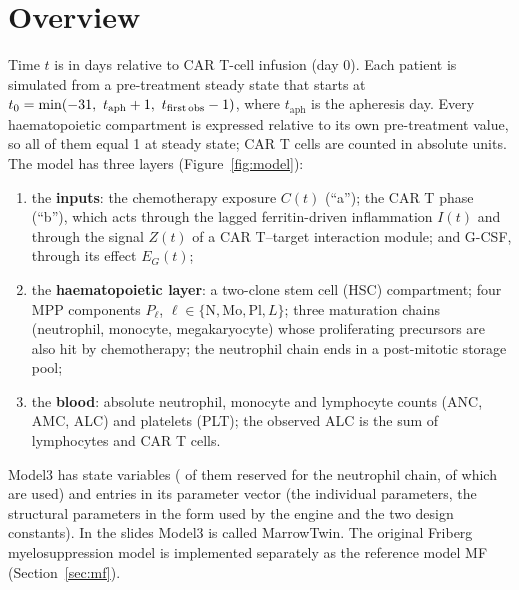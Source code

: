 \documentclass[11pt]{article}
\begin{document}
\tableofcontents
\clearpage

\section{Overview}

Time $t$ is in days relative to CAR T-cell infusion (day 0). Each patient is simulated from a pre-treatment steady state that starts at $t_0=\min(\valTmin,\ t_{\mathrm{aph}}+1,\ t_{\mathrm{first\,obs}}-1)$, where $t_{\mathrm{aph}}$ is the apheresis day. Every haematopoietic compartment is expressed relative to its own pre-treatment value, so all of them equal 1 at steady state; CAR T cells are counted in absolute units. The model has three layers (Figure~\ref{fig:model}):
\begin{enumerate}
\item the \textbf{inputs}: the chemotherapy exposure $C(t)$ (``a''); the CAR T phase (``b''), which acts through the lagged ferritin-driven inflammation $I(t)$ and through the signal $Z(t)$ of a CAR T--target interaction module; and G-CSF, through its effect $E_G(t)$;
\item the \textbf{haematopoietic layer}: a two-clone stem cell (HSC) compartment; four MPP components $P_\ell$, $\ell\in\{\mathrm{N},\mathrm{Mo},\mathrm{Pl},L\}$; three maturation chains (neutrophil, monocyte, megakaryocyte) whose proliferating precursors are also hit by chemotherapy; the neutrophil chain ends in a post-mitotic storage pool;
\item the \textbf{blood}: absolute neutrophil, monocyte and lymphocyte counts (ANC, AMC, ALC) and platelets (PLT); the observed ALC is the sum of lymphocytes and CAR T cells.
\end{enumerate}
Model3 has \valNStates{} state variables (\valNTnSlots{} of them reserved for the neutrophil chain, of which \valNTrN{} are used) and \valNPar{} entries in its parameter vector (the individual parameters, the structural parameters in the form used by the engine and the two design constants). In the slides Model3 is called MarrowTwin. The original Friberg myelosuppression model \citep{friberg2002} is implemented separately as the reference model MF (Section~\ref{sec:mf}).
\end{document}
